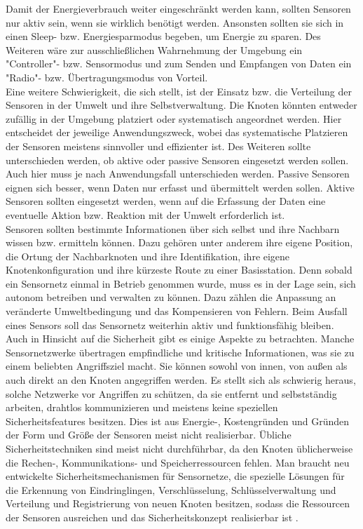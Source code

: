 Damit der Energieverbrauch weiter eingeschränkt werden kann, sollten Sensoren nur aktiv sein, wenn sie wirklich benötigt werden. Ansonsten sollten sie sich in einen Sleep- bzw. Energiesparmodus begeben, um Energie zu sparen. Des Weiteren wäre zur ausschließlichen Wahrnehmung der Umgebung ein "Controller"- bzw. Sensormodus und zum Senden und Empfangen von Daten ein "Radio"- bzw. Übertragungsmodus von Vorteil.\\

Eine weitere Schwierigkeit, die sich stellt, ist der Einsatz bzw. die Verteilung der Sensoren in der Umwelt und ihre Selbstverwaltung. Die Knoten könnten entweder zufällig in der Umgebung platziert oder systematisch angeordnet werden. Hier entscheidet der jeweilige Anwendungszweck, wobei das systematische Platzieren der Sensoren meistens sinnvoller und effizienter ist.
Des Weiteren sollte unterschieden werden, ob aktive oder passive Sensoren eingesetzt werden sollen. Auch hier muss je nach Anwendungsfall unterschieden werden. Passive Sensoren eignen sich besser, wenn Daten nur erfasst und übermittelt werden sollen. Aktive Sensoren sollten eingesetzt werden, wenn auf die Erfassung der Daten eine eventuelle Aktion bzw. Reaktion mit der Umwelt erforderlich ist.\\ 

Sensoren sollten bestimmte Informationen über sich selbst und ihre Nachbarn wissen bzw. ermitteln können. Dazu gehören unter anderem ihre eigene Position, die Ortung der Nachbarknoten und ihre Identifikation, ihre eigene Knotenkonfiguration und ihre kürzeste Route zu einer Basisstation. Denn sobald ein Sensornetz einmal in Betrieb genommen wurde, muss es in der Lage sein, sich autonom betreiben und verwalten zu können. Dazu zählen die Anpassung an veränderte Umweltbedingung und das Kompensieren von Fehlern. Beim Ausfall eines Sensors soll das Sensornetz weiterhin aktiv und funktionsfähig bleiben.\\

Auch in Hinsicht auf die Sicherheit gibt es einige Aspekte zu betrachten. Manche Sensornetzwerke übertragen empfindliche und kritische Informationen, was sie zu einem beliebten Angriffsziel macht. Sie können sowohl von innen, von außen als auch direkt an den Knoten angegriffen werden. Es stellt sich als schwierig heraus, solche Netzwerke vor Angriffen zu schützen, da sie entfernt und selbstständig arbeiten, drahtlos kommunizieren und meistens keine speziellen Sicherheitsfeatures besitzen. Dies ist aus Energie-, Kostengründen und Gründen der Form und Größe der Sensoren meist nicht realisierbar. Übliche Sicherheitstechniken sind meist nicht durchführbar, da den Knoten üblicherweise die Rechen-, Kommunikations- und Speicherressourcen fehlen. Man braucht neu entwickelte Sicherheitsmechanismen für Sensornetze, die spezielle Lösungen für die Erkennung von Eindringlingen, Verschlüsselung, Schlüsselverwaltung und Verteilung und Registrierung von neuen Knoten besitzen, sodass die Ressourcen der Sensoren ausreichen und das Sicherheitskonzept realisierbar ist \cite{d:wolf}.